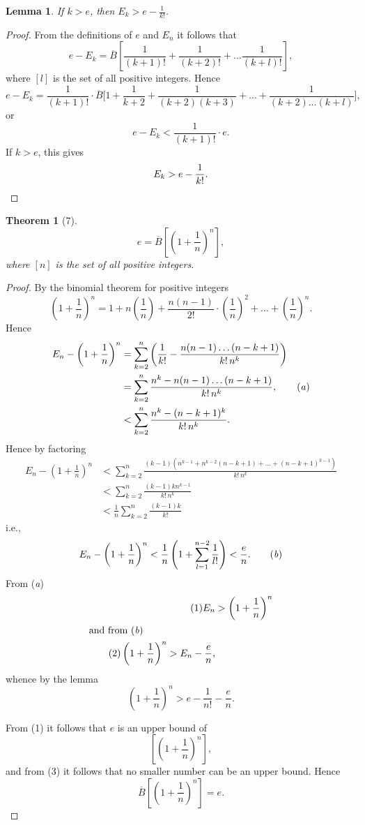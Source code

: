 \documentclass[a4paper,12pt]{book}[2004/02/16]
\providecommand{\hyperlink}[2]{#2}
\providecommand{\hypertarget}[2]{#2}
\theoremstyle{ilemma}
\newtheorem*{lemma}{Lemma}
\theoremstyle{itheorem}
\newtheorem{theorem}{Theorem}
\theoremstyle{iother}
\theoremstyle{icorollary}
\theoremstyle{numcorollary}
\theoremstyle{idefinition}
\begin{document}
\begin{lemma}
If $k>e$, then $E_k > e-\frac{1}{k!}$.
\end{lemma}
\begin{proof}
From the definitions of $e$ and $E_n$ it follows that
\[
  e-E_k = \overline{B} \left[
  \frac{1}{(k+1)!} +
  \frac{1}{(k+2)!} +
  \ldots
  \frac{1}{(k+l)!} \right],
\]
where $[l]$ is the set of all positive integers. Hence
\[
  e-E_k = \frac{1}{(k+1)!} \cdot
  \overline{B} \biggl[1+
  \frac{1}{k+2} +
  \frac{1}{(k+2)(k+3)} +
  \ldots
  + \frac{1}{(k+2) \ldots (k+l)} \biggr],
\]
or
\[
  e-E_k < \frac{1}{(k+1)!} \cdot e.
\]
If $k>e$, this gives
\[
  E_k > e-\frac{1}{k!}.\qedhere
\]
\end{proof}
\begin{theorem}[7]\hypertarget{thm7}{}\label{t7p17}
\[
  e=\overline{B}\left[\left(1+\frac1n\right)^n\right],
\]
where $[n]$ is the set of all positive integers.
\end{theorem}
\begin{proof}
By the binomial theorem for positive integers
\[
  \left(1+\frac1n \right)^n
  = 1 + n\left(\frac1n \right)
  + \frac{n(n-1)}{2!} \cdot \left(\frac1n \right)^2 + \ldots
  + \left(\frac1n \right)^n.
\]
Hence
\begin{align*}
   E_n-\left(1+\frac1n \right)^n
  &= \sum^n_{k=2}
  \left(\frac{1}{k!}-\frac{n(n-1) \ldots (n-k+1)}{k!\, n^k} \right)
\\\hypertarget{eqap17}{%
  &= \sum^n_{k=2}
  \frac{n^k-n(n-1) \ldots (n-k+1)}{k!\,n^k},
\tag{\textit{a}}}
\\
  &< \sum^n_{k=2}
  \frac{n^k-(n-k+1)^k}{k!\,n^k}.
\end{align*}
Hence by factoring
\begin{align*}
  E_n-\left(1+\frac1n \right)^n
  &< \sum^n_{k=2}
  \frac{(k-1)(n^{k-1} + n^{k-2}(n-k+1) + \ldots
       + (n-k+1)^{k-1}) }{k!\,n^k}
\\
  &< \sum^n_{k=2}
  \frac{(k-1)k n^{k-1}}{k!\,n^k}
\\
  &< \frac1n \sum^n_{k=2}
  \frac{(k-1)k}{k!}
\end{align*}
i.e.,
\hypertarget{eqbp17}{\[
  E_n-\left(1+\frac1n \right)^n
  < \frac1n\left(1+\sum^{n-2}_{l=1} \frac{1}{l!} \right)
  < \frac en.
\tag{\textit{b}}
\]}
From \hyperlink{eqap17}{(\textit{a})}
\begin{align*}
\hypertarget{eq1p17}{\tag{1}
  E_n &> \left(1+\frac1n \right)^n\\}
  \intertext{and from \hyperlink{eqbp17}{(\textit{b})}}
\tag{2}
  \left(1+\frac1n \right)^n > E_n-\frac en,
\end{align*}
whence by the lemma
\hypertarget{eq3p18}{\[
  \left(1+\frac1n \right)^n > e-\frac{1}{n!}-\frac en.
\tag{3}
\]}

From \hyperlink{eq1p17}{(1)} it follows that $e$ is an upper bound of
\[
  \left[\left(1+\frac1n \right)^n\right],
\]
and from \hyperlink{eq3p18}{(3)} it follows that no smaller number can be an upper
bound. Hence
\[
  \overline{B}\left[\left(1+\frac1n \right)^n\right] = e.
\]\label{endpf18}
\end{proof}
\end{document}
